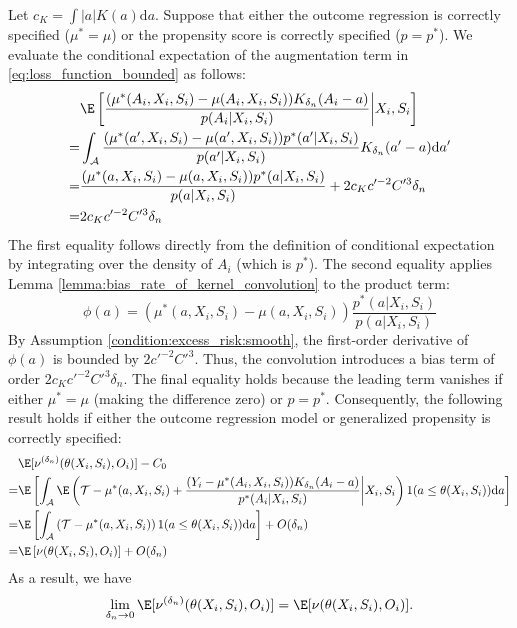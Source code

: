 \noindent Let $c_K = \int |a|K(a)\mathrm{d}a$. Suppose that either the outcome regression is correctly specified ($\mu^* = \mu$) or the propensity score is correctly specified ($p = p^*$). We evaluate the conditional expectation of the augmentation term in \eqref{eq:loss_function_bounded} as follows:
\begin{align*}    &\E\left[\frac{(\mu^*(A_i,X_i,S_i) - \mu(A_i,X_i,S_i))K_{\delta_n}(A_i-a)}{p(A_{i}|X_{i},S_{i})}\bigg| X_i,S_i\right]\\
    = & \int_{\mathcal{A}}\frac{(\mu^*(a^\prime,X_i,S_i) - \mu(a^\prime,X_i,S_i))p^*(a^\prime|X_{i},S_{i})}{p(a^\prime|X_{i},S_{i})}K_{\delta_n}(a^\prime-a)\mathrm{d}a^\prime\\
    = & \frac{(\mu^*(a,X_i,S_i) - \mu(a,X_i,S_i))p^*(a|X_{i},S_{i})}{p(a|X_{i},S_{i})} + 2c_K c^{\prime-2}C^{\prime 3}\delta_n\\
    =& 2c_K c^{\prime-2}C^{\prime 3}\delta_n
\end{align*}
The first equality follows directly from the definition of conditional expectation by integrating over the density of $A_i$ (which is $p^*$). The second equality applies Lemma \ref{lemma:bias_rate_of_kernel_convolution} to the product term:$$\phi(a) = (\mu^*(a, X_i, S_i) - \mu(a, X_i, S_i)) \frac{p^*(a | X_i, S_i)}{p(a | X_i, S_i)}$$By Assumption \ref{condition:excess_risk:smooth}, the first-order derivative of $\phi(a)$ is bounded by $2c'^{-2}C'^{3}$. Thus, the convolution introduces a bias term of order $2c_K c'^{-2}C'^{3} \delta_n$. The final equality holds because the leading term vanishes if either $\mu^* = \mu$ (making the difference zero) or $p = p^*$. Consequently, the following result holds  if either the outcome regression model or generalized propensity is correctly specified:
\begin{align*}
   &\E[\nu^{(\delta_n)}(\theta(X_i,S_i),O_i)] - C_0 \\
   = &\E\left[ \int_{\mathcal{A}} \E\left(\mathcal{T} - \mu^*(a,X_i,S_i)+ \frac{(Y_i - \mu^*(A_i,X_i,S_i))K_{\delta_n}(A_i-a)}{p^*(A_{i}|X_{i},S_{i})}\bigg| X_i,S_i\right)1(a\leq \theta(X_i,S_i))\mathrm{d}a\right]\\
   = & \E\left[\int_{\mathcal{A}}\left(\mathcal{T} - \mu^*(a,X_i,S_i)\right)1(a\leq \theta(X_i,S_i))\mathrm{d}a\right] + O(\delta_n)\\
   = & \E\left[\nu(\theta(X_i,S_i),O_i)\right] + O(\delta_n)
\end{align*}
As a result, we have $$\lim_{{\delta_n\rightarrow 0}}\E[\nu^{(\delta_n)}(\theta(X_i,S_i),O_i)] = \E[\nu(\theta(X_i,S_i),O_i)].$$

